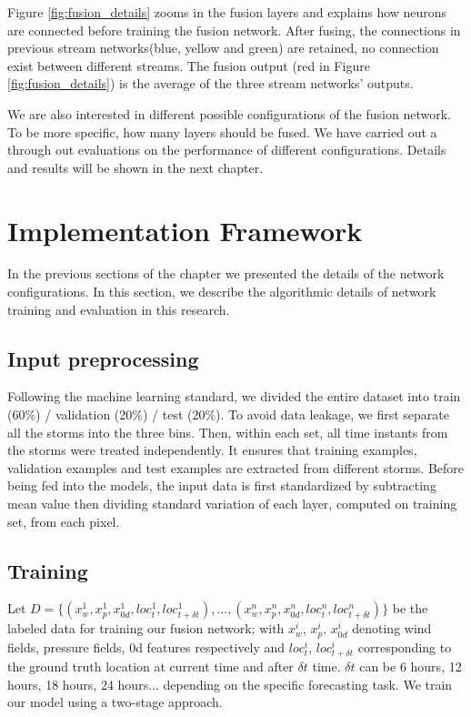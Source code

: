 Figure \ref{fig:fusion_details} zooms in the fusion layers and explains how neurons are connected before training the fusion network. After fusing, the connections in previous stream networks(blue, yellow and green) are retained, no connection exist between different streams. The fusion output (red in Figure \ref{fig:fusion_details}) is the average of the three stream networks' outputs. 

We are also interested in different possible configurations of the fusion network. To be more specific, how many layers should be fused. We have carried out a through out evaluations on the performance of different configurations. Details and results will be shown in the next chapter. 








\section{Implementation Framework}
In the previous sections of the chapter we presented the details of the network configurations. In this section, we describe the algorithmic details of network training and evaluation in this research.

\subsection{Input preprocessing}
 Following the machine learning standard, we divided the entire dataset into train (60\%) / validation (20\%) / test (20\%). To avoid data leakage, we first separate all the storms into the three bins. Then, within each set, all time instants from the storms were treated  independently. It ensures that training examples, validation examples and test examples are extracted from different storms. Before being fed into the models, the input data is first standardized by subtracting mean value then dividing standard variation of each layer, computed on training set, from each pixel. 

\subsection{Training}  
Let $D = \{(x_w^1, x_p^1, x_{0d}^1, loc_t^1, loc_{t+\delta t}^1), ..., (x_w^n, x_p^n, x_{0d}^n, loc_t^n, loc_{t+\delta t}^n)\}$ be the labeled data for training our fusion network; with $x_w^i$, $x_p^i$, $x_{0d}^i$ denoting wind fields, pressure fields, 0d features respectively and $loc_t^i$, $loc_{t+\delta t}^i$ corresponding to the ground truth location at current time and after $\delta t$ time. $\delta t$ can be 6 hours, 12 hours, 18 hours, 24 hours... depending on the specific forecasting task. We train our model using a two-stage approach.


